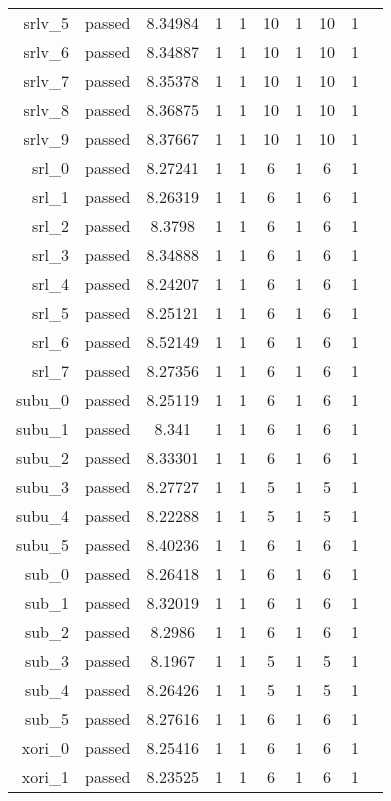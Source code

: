 \begin{longtable}{r|ccccccccc}
    srlv\_5 & passed & 8.34984 & 1 & 1 & 10 & 1 & 10 & 1 \\
    srlv\_6 & passed & 8.34887 & 1 & 1 & 10 & 1 & 10 & 1 \\
    srlv\_7 & passed & 8.35378 & 1 & 1 & 10 & 1 & 10 & 1 \\
    srlv\_8 & passed & 8.36875 & 1 & 1 & 10 & 1 & 10 & 1 \\
    srlv\_9 & passed & 8.37667 & 1 & 1 & 10 & 1 & 10 & 1 \\
    srl\_0 & passed & 8.27241 & 1 & 1 & 6 & 1 & 6 & 1 \\
    srl\_1 & passed & 8.26319 & 1 & 1 & 6 & 1 & 6 & 1 \\
    srl\_2 & passed & 8.3798 & 1 & 1 & 6 & 1 & 6 & 1 \\
    srl\_3 & passed & 8.34888 & 1 & 1 & 6 & 1 & 6 & 1 \\
    srl\_4 & passed & 8.24207 & 1 & 1 & 6 & 1 & 6 & 1 \\
    srl\_5 & passed & 8.25121 & 1 & 1 & 6 & 1 & 6 & 1 \\
    srl\_6 & passed & 8.52149 & 1 & 1 & 6 & 1 & 6 & 1 \\
    srl\_7 & passed & 8.27356 & 1 & 1 & 6 & 1 & 6 & 1 \\
    subu\_0 & passed & 8.25119 & 1 & 1 & 6 & 1 & 6 & 1 \\
    subu\_1 & passed & 8.341 & 1 & 1 & 6 & 1 & 6 & 1 \\
    subu\_2 & passed & 8.33301 & 1 & 1 & 6 & 1 & 6 & 1 \\
    subu\_3 & passed & 8.27727 & 1 & 1 & 5 & 1 & 5 & 1 \\
    subu\_4 & passed & 8.22288 & 1 & 1 & 5 & 1 & 5 & 1 \\
    subu\_5 & passed & 8.40236 & 1 & 1 & 6 & 1 & 6 & 1 \\
    sub\_0 & passed & 8.26418 & 1 & 1 & 6 & 1 & 6 & 1 \\
    sub\_1 & passed & 8.32019 & 1 & 1 & 6 & 1 & 6 & 1 \\
    sub\_2 & passed & 8.2986 & 1 & 1 & 6 & 1 & 6 & 1 \\
    sub\_3 & passed & 8.1967 & 1 & 1 & 5 & 1 & 5 & 1 \\
    sub\_4 & passed & 8.26426 & 1 & 1 & 5 & 1 & 5 & 1 \\
    sub\_5 & passed & 8.27616 & 1 & 1 & 6 & 1 & 6 & 1 \\
    xori\_0 & passed & 8.25416 & 1 & 1 & 6 & 1 & 6 & 1 \\
    xori\_1 & passed & 8.23525 & 1 & 1 & 6 & 1 & 6 & 1 \\

\end{longtable}
